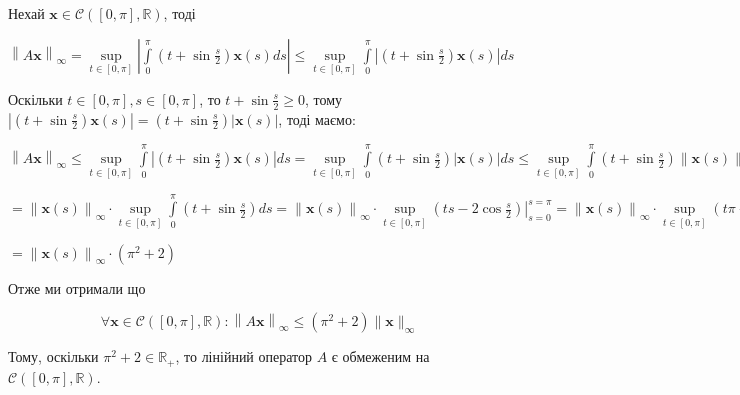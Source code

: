 \documentclass[a5paper, 20pt, titlepage]{article}
\newcommand{\x}{\textbf{x}}
\begin{document}
Нехай $\x \in \mathcal{C} \left( [0, \pi], \mathbb{R} \right)$, тоді

\vspace{3mm}
\hspace{4mm}
$\left\| A \x \right\|_\infty = \sup \limits_{t \in [0, \pi]} \left| \int \limits_{0}^{\pi} \left( t + \sin \frac{s}{2} \right) \x(s)  ds \right|
\leqslant \sup \limits_{t \in [0, \pi]}  \int \limits_{0}^{\pi} \left| \left( t + \sin \frac{s}{2} \right) \x(s) \right| ds$

\vspace{5mm}
Оскільки $t \in [0, \pi], s \in [0, \pi]$, то $ t + \sin \frac{s}{2} \geqslant 0$, тому $\left| \left( t + \sin \frac{s}{2} \right) \x(s) \right| = \left( t + \sin \frac{s}{2} \right)  \left| \x(s) \right|$, тоді маємо:

\vspace{5mm}
\hspace{4mm}
$\left\| A \x \right\|_\infty \leqslant \sup \limits_{t \in [0, \pi]}  \int \limits_{0}^{\pi} \left| \left( t + \sin \frac{s}{2} \right) \x(s) \right| ds =
\sup \limits_{t \in [0, \pi]}  \int \limits_{0}^{\pi} \left( t + \sin \frac{s}{2} \right)  \left| \x(s) \right| ds \leqslant
\sup \limits_{t \in [0, \pi]}  \int \limits_{0}^{\pi} \left( t + \sin \frac{s}{2} \right)  \left\| \x(s) \right\|_\infty ds = $

\vspace{4mm}
\hspace{16mm}
$= \left\| \x(s) \right\|_\infty \cdot \sup \limits_{t \in [0, \pi]}  \int \limits_{0}^{\pi} \left( t + \sin \frac{s}{2} \right) ds =
\left\| \x(s) \right\|_\infty \cdot \sup \limits_{t \in [0, \pi]}   \left. \left( ts - 2 \cos \frac{s}{2} \right) \right|_{s = 0}^{s = \pi} =
\left\| \x(s) \right\|_\infty \cdot \sup \limits_{t \in [0, \pi]} (t\pi + 2) =$

\vspace{4mm}
\hspace{16mm}
$= \left\| \x(s) \right\|_\infty \cdot (\pi^2 + 2)$

\vspace{4mm}
Отже ми отримали що 

\vspace{-3mm}
$$\forall \x \in \mathcal{C} \left( [0, \pi], \mathbb{R} \right): \left\| A \x \right\|_\infty \leqslant (\pi^2 + 2) \| \x \|_\infty $$

Тому, оскільки $\pi^2 + 2 \in \mathbb{R_+}$, то лінійний оператор $A$ є обмеженим на $\mathcal{C} \left( [0, \pi], \mathbb{R} \right)$.
\end{document}
